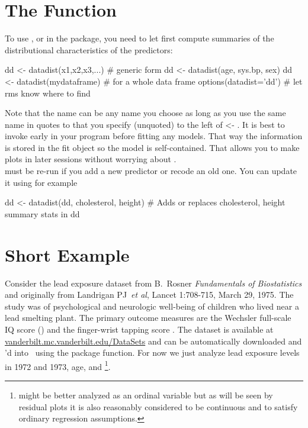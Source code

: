 \section{The   Function}%
\ipacue
To use , or  in the 
  package, you need to let  first compute summaries of the
  distributional characteristics of the predictors:
\begin{Schunk}
\begin{Sinput}
dd <- datadist(x1,x2,x3,...)   # generic form
dd <- datadist(age, sys.bp, sex)
dd <- datadist(mydataframe)    # for a whole data frame
options(datadist='dd')         # let rms know where to find
\end{Sinput}
\end{Schunk}
Note that the name  can be any name you choose as long as you
use the same name in quotes to  that you specify
(unquoted) to the left of <- .  It is best to
invoke  early in your program before fitting any
models.  That way the  information is stored in the fit
  object so the model is self-contained.  That allows you to make
  plots in later sessions without worrying about .  \\
 must be re-run if you add a new predictor or recode an
old one.  You can update it using for example
\begin{Schunk}
\begin{Sinput}
dd <- datadist(dd, cholesterol, height)
# Adds or replaces cholesterol, height summary stats in dd
\end{Sinput}
\end{Schunk}

\section{Short Example}\label{sec:rmsintro-leadcontinuous}\ipacue{}
Consider the lead exposure dataset from B.\ Rosner \emph{Fundamentals
  of Biostatistics} and originally from Landrigan PJ~\emph{et al}, Lancet
1:708-715, March 29, 1975.  The study was of psychological and
neurologic well-being of children who lived near a lead smelting
plant.  The primary outcome measures are the Wechsler full-scale IQ
score () and the finger-wrist tapping score .  The
dataset is available at \url{vanderbilt.mc.vanderbilt.edu/DataSets}
and can be automatically downloaded and 'd into \R\ using
the  package  function.  For now we just
analyze lead exposure levels in 1972 and 1973, age, and
\footnote{ might be better analyzed as an
  ordinal variable but as will be seen by residual plots it is also
  reasonably considered to be continuous and to satisfy ordinary
  regression assumptions.}.

